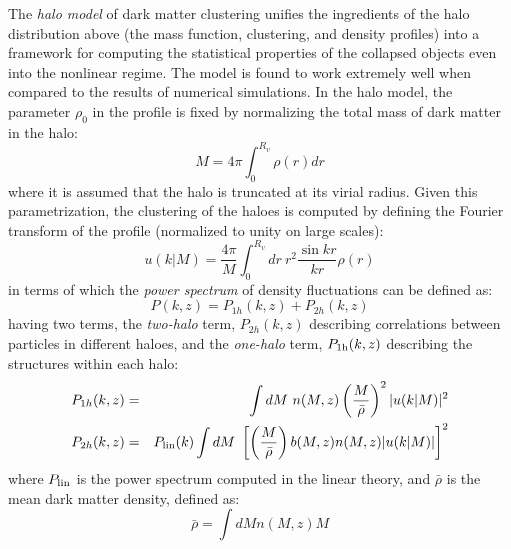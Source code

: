 The \textit{halo model} of dark matter clustering unifies the ingredients of the halo distribution above (the mass function, clustering, and density profiles) into a framework for computing the statistical properties of the collapsed objects even into the nonlinear regime. The model is found to work extremely well when compared to the results of numerical simulations. In the halo model, the parameter $\rho_0$ in the profile is fixed by normalizing the total mass of dark matter in the halo:
\begin{equation}
    M = 4 \pi \int_0^{R_{v}} \rho(r) dr 
\end{equation}
where it is assumed that the halo is truncated at its virial radius. Given this parametrization, the clustering of the haloes is computed by defining the Fourier transform of the profile (normalized to unity on large scales):
\begin{equation}
    u(k|M) = \frac{4 \pi}{M} \int_0^{R_v} dr \ r^2 \frac{\sin kr}{kr}{\rho(r)}
    \label{udm}
\end{equation}
in terms of which the \textit{power spectrum} of density fluctuations can be defined as:
\begin{equation}
    P(k,z) = P_{1h} (k,z) + P_{2h} (k,z)
\end{equation}
having two terms, the \textit{two-halo} term, $P_{2h} (k,z)$ describing correlations between particles in different haloes, and the \textit{one-halo} term, $P_{\rm 1h}(k,z)$ describing the structures within each halo:
\begin{eqnarray}
    P_{1h}(k, z) &=& \int dM \  n(M, z) \left(\frac{M}{\bar{\rho}}\right)^2 |u(k|M)|^2 \nonumber \\
     P_{2h}(k, z) &=& P_{\rm lin} (k) \int dM \ \left[ \left(\frac{M}{\bar{\rho}}\right) b(M,z)  n(M, z)  |u(k|M)|\right]^2
     \label{powerspecdm}
\end{eqnarray}
where $P_{\rm lin}$ is the power spectrum computed  in the linear theory, and $\bar{\rho}$ is the mean dark matter density, defined as:
\begin{equation}
    \bar{\rho} = \int dM n(M,z) M 
\end{equation}



